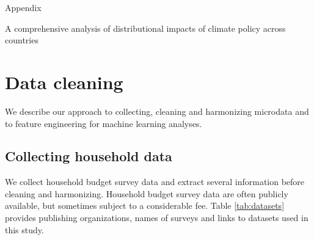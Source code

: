 \documentclass[12pt, a4paper]{article}
\begin{document}
\appendix 
\begin{refsection}
{\Huge Appendix} \label{sec:appendix}

A comprehensive analysis of distributional impacts of climate policy across countries

\clearpage
\section{Data cleaning} \label{sec:cleaning}

We describe our approach to collecting, cleaning and harmonizing microdata and to feature engineering for machine learning analyses.

\subsection{Collecting household data}

We collect household budget survey data and extract several information before cleaning and harmonizing. Household budget survey data are often publicly available, but sometimes subject to a considerable fee. Table \ref{tab:datasets} provides publishing organizations, names of surveys and links to datasets used in this study.


\end{refsection}
\end{document}

